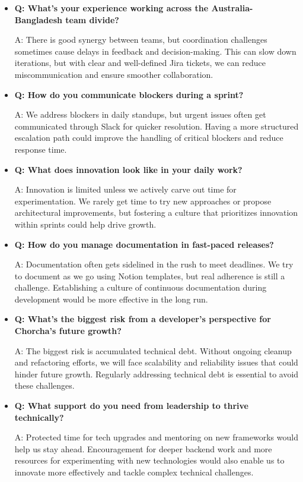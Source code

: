 \documentclass[12pt,a4paper,oneside]{book}
\begin{document}
\begin{itemize}
\item \textbf{Q: What’s your experience working across the Australia-Bangladesh team divide?} 

A: There is good synergy between teams, but coordination challenges sometimes cause delays in feedback and decision-making. This can slow down iterations, but with clear and well-defined Jira tickets, we can reduce miscommunication and ensure smoother collaboration.

\item \textbf{Q: How do you communicate blockers during a sprint?} 

A: We address blockers in daily standups, but urgent issues often get communicated through Slack for quicker resolution. Having a more structured escalation path could improve the handling of critical blockers and reduce response time.

\item \textbf{Q: What does innovation look like in your daily work?} 

A: Innovation is limited unless we actively carve out time for experimentation. We rarely get time to try new approaches or propose architectural improvements, but fostering a culture that prioritizes innovation within sprints could help drive growth.

\item \textbf{Q: How do you manage documentation in fast-paced releases?} 

A: Documentation often gets sidelined in the rush to meet deadlines. We try to document as we go using Notion templates, but real adherence is still a challenge. Establishing a culture of continuous documentation during development would be more effective in the long run.

\item \textbf{Q: What’s the biggest risk from a developer’s perspective for Chorcha’s future growth?} 

A: The biggest risk is accumulated technical debt. Without ongoing cleanup and refactoring efforts, we will face scalability and reliability issues that could hinder future growth. Regularly addressing technical debt is essential to avoid these challenges.

\item \textbf{Q: What support do you need from leadership to thrive technically?} 

A: Protected time for tech upgrades and mentoring on new frameworks would help us stay ahead. Encouragement for deeper backend work and more resources for experimenting with new technologies would also enable us to innovate more effectively and tackle complex technical challenges.
\end{itemize}
\end{document}

